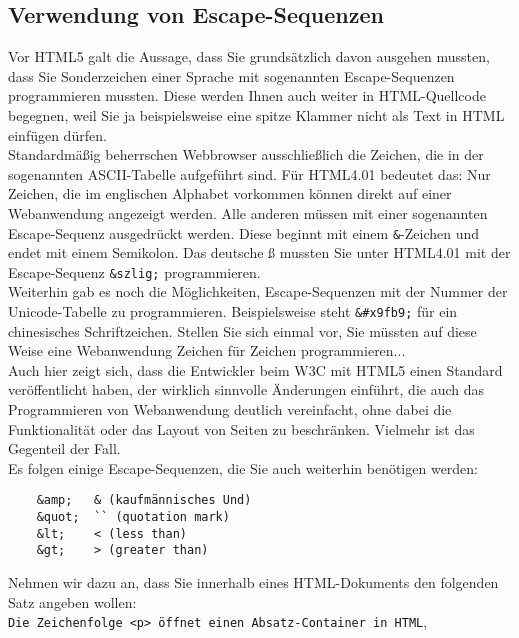 \subsection{Verwendung von Escape-Sequenzen}

Vor HTML5 galt die Aussage, dass Sie grundsätzlich davon ausgehen mussten, dass Sie Sonderzeichen einer Sprache mit sogenannten Escape-Sequenzen programmieren mussten. Diese werden Ihnen auch weiter in HTML-Quellcode begegnen, weil Sie ja beispielsweise eine spitze Klammer nicht als Text in HTML einfügen dürfen.\\

Standardmäßig beherrschen Webbrowser ausschließlich die Zeichen, die in der sogenannten ASCII-Tabelle aufgeführt sind. Für HTML4.01 bedeutet das: Nur Zeichen, die im englischen Alphabet vorkommen können direkt auf einer Webanwendung angezeigt werden. Alle anderen müssen mit einer sogenannten Escape-Sequenz ausgedrückt werden. Diese beginnt mit einem \verb|&|-Zeichen und endet mit einem Semikolon. Das deutsche ß mussten Sie unter HTML4.01 mit der Escape-Sequenz \verb|&szlig;| programmieren.\\

Weiterhin gab es noch die Möglichkeiten, Escape-Sequenzen mit der Nummer der Unicode-Tabelle zu programmieren. Beispielsweise steht \verb|&#x9fb9;| für ein chinesisches Schriftzeichen. Stellen Sie sich einmal vor, Sie müssten auf diese Weise eine Webanwendung Zeichen für Zeichen programmieren...\\

Auch hier zeigt sich, dass die Entwickler beim W3C mit HTML5 einen Standard veröffentlicht haben, der wirklich sinnvolle Änderungen einführt, die auch das Programmieren von Webanwendung deutlich vereinfacht, ohne dabei die Funktionalität oder das Layout von Seiten zu beschränken. Vielmehr ist das Gegenteil der Fall.\\

Es folgen einige Escape-Sequenzen, die Sie auch weiterhin benötigen werden:\\

\begin{verbatim}
	&amp;	& (kaufmännisches Und)
	&quot;	`` (quotation mark)
	&lt;	< (less than)
	&gt;	> (greater than)
\end{verbatim}

Nehmen wir dazu an, dass Sie innerhalb eines HTML-Dokuments den folgenden Satz angeben wollen:\\

\verb|Die Zeichenfolge <p> öffnet einen Absatz-Container in HTML|, \\

